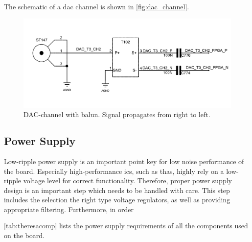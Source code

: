 The schematic of a \gls{dac} channel is shown in \autoref{fig:dac_channel}.
\begin{figure}[tbh]
	\centering
	\includegraphics[width = \textwidth]{chap/04-theresa/img/schematic/dac_channel}
	\caption{DAC-channel with balun. Signal propagates from right to left.}
	\label{fig:dac_channel}
\end{figure}


\subsection{Power Supply}
Low-ripple power supply is an important point key for low noise performance of the board. Especially high-performance \Glspl{ic}, such as \glspl{tha}, highly rely on a low-ripple voltage level for correct functionality. 
Therefore, proper power supply design is an important step which needs to be handled with care.
This step includes the selection the right type voltage regulators, as well as providing appropriate filtering. 
Furthermore, in order 

\autoref{tab:theresacomp} lists the power supply requirements of all the components used on the board.

